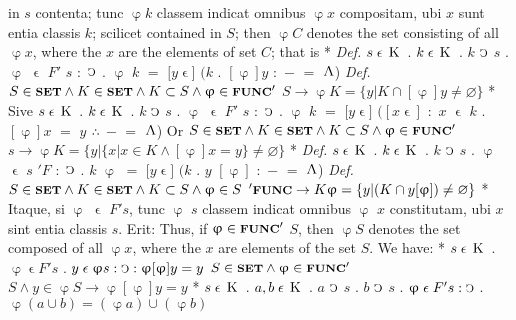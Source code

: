 \documentclass{book}
\newcommand{\C}{\mathop{\sbox0{$\displaystyle$$\reflectbox{C}$} %
\raisebox{-\height+\ht0-0.05cm}[\ht0][\dp0]{\scalebox{0.8}[0.8]{\copy0}}}\displaylimits} %
\newcommand{\pppNoSpace}{\leavevmode\lower0ex\hbox{.}\kern-0.1em\raise0.7ex\hbox{.}\kern-0.1em\lower0ex\hbox{.}} %
\newcommand{\abs}{\mathop{\rotatebox[origin=c]{180}{V}}}
\newcommand{\smallIn}{\ensuremath{\mathrel{\epsilon}}}
\newcommand{\K}{\mathop{\thinspace \text{K} \thinspace}}
\newcommand{\setOfSets}{\mathord{\text{{\footnotesize \textbf{SET}}}}}
\newcommand{\func}{\mathord{\text{{\footnotesize \textbf{FUNC}}}}}
\newenvironment{translateTwoCol}
               { %
                 \columnratio{0.5, 0.5} \begin{paracol}{2}
                 \newcommand{\LAT}{\switchcolumn[0]*}
                 \newcommand{\ENG}{\switchcolumn[1]}
               }
               { %
                 \let\ENG\undefined
                 \let\LAT\undefined
                 \end{paracol}
               }
\begin{document}
\begin{translateTwoCol}
in $s$ contenta; tunc $\upvarphi k$ classem indicat omnibus $\upvarphi x$ compositam, ubi $x$ sunt entia classis $k$; scilicet
\ENG
contained in $S$; then $\upvarphi C$ denotes the set consisting of all $\upvarphi x$, where the $x$ are the elements of set $C$; that is
\LAT
\emph{Def.} \hspace{0.25cm} $s \smallIn \K$ $.$ $k \smallIn \K$ $.$ $k$ $\C$ $s$ $.$ $\upvarphi$ $\smallIn$ $F'$ $s$ $:$ $\C$ $.$ $\upvarphi$ $k$ $=$ $[y $\smallIn$]$ $(k$ $.$ $[\upvarphi]y$ $:$ $-$ $=$ $\abs$)
\ENG
\emph{Def.} \hspace{0.25cm} $S \in \setOfSets \wedge K \in \setOfSets \wedge K \subset S \wedge \upvarphi \in \func'$ $S \rightarrow \upvarphi K = \{ y | K \cap [\upvarphi]y \neq \varnothing \}$
\LAT
Sive \hspace{0.25cm} $s \smallIn \K$ $.$ $k \smallIn \K$ $.$ $k$ $\C$ $s$ $.$ $\upvarphi$ $\smallIn$ $F'$ $s$ $:$ $\C$ $.$ $\upvarphi$ $k$ $=$ $[y $\smallIn$]$ $([x\smallIn]$ $:$ $x$ $\smallIn$ $k$ $.$ $[\upvarphi]x$ $=$ $y$ $\pppNoSpace$ $-$ $=$ $\abs$)
\ENG
Or \hspace{0.25cm} $S \in \setOfSets \wedge K \in \setOfSets \wedge K \subset S \wedge \upvarphi \in \func'$ $s \rightarrow \upvarphi K = \{ y | \{ x | x \in K \wedge [\upvarphi]x = y \} \neq \varnothing \}$
\LAT
\emph{Def.} \hspace{0.25cm} $s \smallIn \K$ $.$ $k \smallIn \K$ $.$ $k$ $\C$ $s$ $.$ $\upvarphi$ $\smallIn$ $s$ $'F$ $:$ $\C$ $.$ $k$ $\upvarphi$ $=$ $[y $\smallIn$]$ $(k$ $.$ $y$ $[\upvarphi]$ $:$ $-$ $=$ $\abs$)
\ENG
\emph{Def.} \hspace{0.25cm} $S \in \setOfSets \wedge K \in \setOfSets \wedge K \subset S \wedge \upvarphi \in S$ $'\func \rightarrow K \upvarphi = \{ y | (K \cap y [\upvarphi]) \neq \varnothing \}$
\LAT
Itaque, si $\upvarphi$ $\smallIn$ $F' s$, tunc $\upvarphi$ $s$ classem indicat omnibus $\upvarphi$ $x$ constitutam, ubi $x$ sint entia classis $s$. Erit:
\ENG
Thus, if $\upvarphi \in \func'$ $S$, then $\upvarphi S$ denotes the set composed of all $\upvarphi x$, where the $x$ are elements of the set $S$. We have:
\LAT
\hspace{1.06cm} $s \smallIn \K$ . $\upvarphi \smallIn F' s$ . $y \smallIn \upvarphi s : \C : \upvarphi [\upvarphi] y = y$
\ENG
\hspace{1.06cm} $S \in \setOfSets \wedge \upvarphi \in \func'$ $S \wedge y \in \upvarphi S \rightarrow \upvarphi [\upvarphi] y = y$
\LAT
\hspace{1.06cm} $s \smallIn \K$ . $a, b \smallIn \K$ . $a$ $\C$ $s$ . $b$ $\C$ $s$ . $\upvarphi \smallIn F' s : \C$ . $\upvarphi (a \cup b) = (\upvarphi a) \cup (\upvarphi b)$

\end{translateTwoCol}
\end{document}

